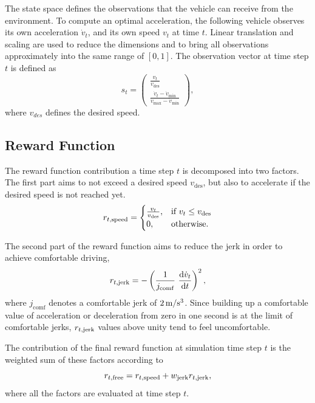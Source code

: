 \documentclass[review]{elsarticle}
\providecommand{\sub}[1]{_{\mathrm{#1}}}  %
\providecommand{\3}{{\ss}}
\begin{document}
	The state space defines the observations that the vehicle can receive from the environment. To compute an optimal
	acceleration, the following vehicle observes its own acceleration $\dot{v}_t$,
	and its own speed $v_t$ at time $t$. Linear translation and scaling are used to
	reduce the dimensions and to bring all observations approximately into
	the same range of $[0,1]$. The observation vector at time step $t$ is defined
	as 	
	\begin{equation}
	\label{eq:stateFree}
	s_t = \begin{pmatrix} \frac{v_t}{v\sub{des}} \\ \frac{\dot{v}_t-\dot{v}\sub{min}}{\dot{v}\sub{max} - \dot{v}\sub{min}}\end{pmatrix},
	\end{equation}
	where $v_{des}$ defines the desired speed.
	\subsection{Reward Function}
	\label{rewardFunctionFree}
	The reward function contribution a time step $t$ is decomposed into two factors. The first part aims to
	not exceed a desired speed $v\sub{des}$, but also to accelerate if the
	desired speed is not reached yet.  
	\begin{equation}
	\label{eq:r1Free}
	r_{t, \rm speed}  = 
	\begin{cases}
	\frac{v_t}{v\sub{des}},
	& \text{if } v_t \leq v\sub{des}\\
	0,
	& \text{otherwise}.
	\end{cases}
	\end{equation}
	
	The second part of the reward function aims to reduce the jerk in
	order to achieve comfortable driving, 
	\begin{equation}
	\label{eq:r2Free}
	r_{t, \rm jerk} = -\left(\frac{1}{j\sub{comf}} \ \dv{\dot{v}_t}{t}\right)^2,
	\end{equation}
	where $j\sub{comf}$ denotes a comfortable jerk of $\unit[2]{m/s^3}$.
	Since building up a comfortable value of acceleration or deceleration
	from zero in one second is at the limit of comfortable jerks, $r_{t, \rm jerk} $
	values above unity tend to feel uncomfortable.
		
	The contribution of the final reward function at simulation time step $t$ is the weighted
	sum of these factors according to
	\begin{equation}
	\label{rt1}
	r_{t, \rm free} =r_{t, \rm speed} + w\sub{jerk} r_{t, \rm jerk} ,
	\end{equation}
	where all the factors are evaluated at time step $t$. 
	
\end{document}
